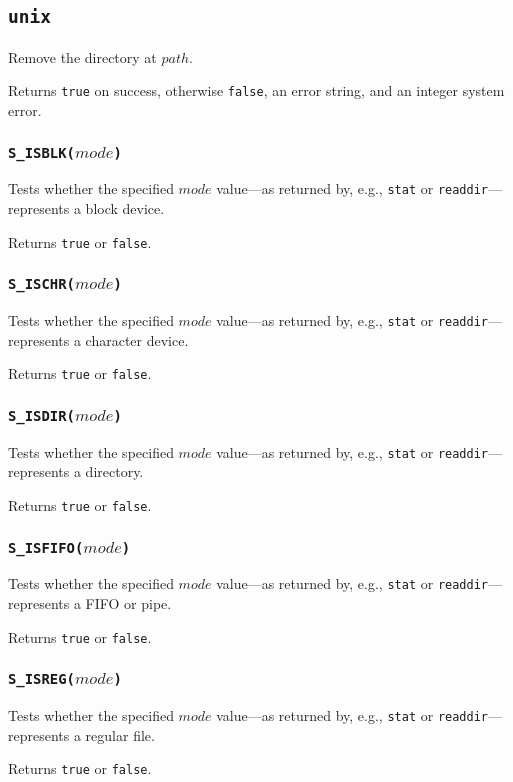 \documentclass[11pt, oneside]{memoir}
\newcommand*{\true}[0]{\texttt{true}\xspace}
\newcommand*{\false}[0]{\texttt{false}\xspace}
\newcommand*{\syscall}[1]{\texttt{#1}\xspace}
\newcommand*{\fn}[1]{\texttt{#1}\xspace}
\newcounter{toccols}
\newenvironment{Module}[1]{
	\subsection{\texttt{#1}}
	\addtocontents{toc}{
		\protect\begin{multicols}{\value{toccols}}
	}
}{
	\addtocontents{toc}{\protect\end{multicols}}
}
\begin{document}
\begin{Module}{unix}
Remove the directory at $path$.

Returns \true on success, otherwise \false, an error string, and an integer system error.

\subsubsection[\fn{S\_ISBLK}]{\fn{S\_ISBLK($mode$)}}

Tests whether the specified $mode$ value---as returned by, e.g., \syscall{stat} or \syscall{readdir}---represents a block device.

Returns \true or \false.

\subsubsection[\fn{S\_ISCHR}]{\fn{S\_ISCHR($mode$)}}

Tests whether the specified $mode$ value---as returned by, e.g., \syscall{stat} or \syscall{readdir}---represents a character device.

Returns \true or \false.

\subsubsection[\fn{S\_ISDIR}]{\fn{S\_ISDIR($mode$)}}

Tests whether the specified $mode$ value---as returned by, e.g., \syscall{stat} or \syscall{readdir}---represents a directory.

Returns \true or \false.

\subsubsection[\fn{S\_ISFIFO}]{\fn{S\_ISFIFO($mode$)}}

Tests whether the specified $mode$ value---as returned by, e.g., \syscall{stat} or \syscall{readdir}---represents a FIFO or pipe.

Returns \true or \false.

\subsubsection[\fn{S\_ISREG}]{\fn{S\_ISREG($mode$)}}

Tests whether the specified $mode$ value---as returned by, e.g., \syscall{stat} or \syscall{readdir}---represents a regular file.

Returns \true or \false.


\end{Module}
\end{document}
